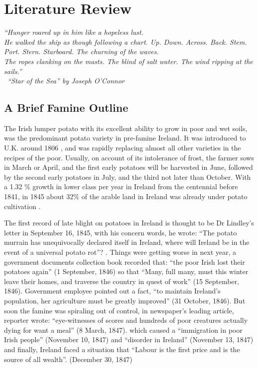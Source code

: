 \chapter{Literature Review}

\textit{``Hunger roared up in him like a hopeless lust.\\ 
He walked the ship as though following a chart. Up. Down. Across. Back. Stem. Port. Stern. Starboard. The churning of the waves. \\
The ropes clanking on the masts. The blind of salt water. The wind ripping at the sails.''\\
\textemdash\ ``Star of the Sea'' by Joseph O'Connor}
\vspace{.2cm}

\section{A Brief Famine Outline}

The Irish lumper potato with its excellent ability to grow in poor and wet soils, was the predominant potato variety in pre-famine Ireland. It was introduced to U.K. around 1806 \citep{tucker2016potato}, and was rapidly replacing almost all other varieties in the recipes of the poor. Usually, on account of its intolerance of frost, the farmer sows in March or April, and the first early potatoes will be harvested in June, followed by the second early potatoes in July, and the third not later than October. With a 1.32 \% growth in lower class per year in Ireland from the centennial before 1841, in 1845 about 32\% of the arable land in Ireland was already under potato cultivation \citep{solar2015ireland}.

The first record of late blight on potatoes in Ireland is thought to be Dr Lindley's letter in September 16, 1845, with his concern words, he wrote: ``The potato murrain has unequivocally declared itself in Ireland, where will Ireland be in the event of a universal potato rot''? \citep{kelly1995great}. Things were getting worse in next year, a government documents collection book recorded that: ``the poor Irish lost their potatoes again'' (1 September, 1846) so that ``Many, full many, must this winter leave their homes, and traverse the country in quest of work'' (15 September, 1846). Government employee pointed out a fact, ``to maintain Ireland's population, her agriculture must be greatly improved'' (31 October, 1846). But soon the famine was spiraling out of control, in newspaper's leading article, reporter wrote: ``eye-witnesses of scores and hundreds of poor creatures actually dying for want a meal'' (8 March, 1847).  which caused a ``immigration in poor Irish people'' (November 10, 1847) and ``disorder in Ireland'' (November 13, 1847) and finally, Ireland faced a situation that ``Labour is the first price and is the source of all wealth''. (December 30, 1847) \citep{times1880famineletter}



